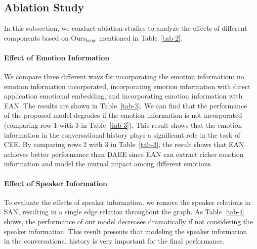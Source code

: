 \documentclass[11pt]{article}
\begin{document}
\subsection{Ablation Study}
In this subsection, we conduct ablation studies to analyze the effects of different components based on $\text{Ours}_{large}$ mentioned in Table~\ref{tab-2}.


\paragraph{Effect of Emotion Information}

We compare three different ways for incorporating the emotion information: no emotion information incorporated, incorporating emotion information with direct application emotional embedding, and incorporating emotion information with EAN. The results are shown in Table~\ref{tab-3}.
We can find that the performance of the proposed model degrades if the emotion information is not incorporated (comparing row 1 with 3 in Table~\ref{tab-3}). This result shows that the emotion information in the conversational history plays a significant role in the task of CEE. By comparing rows 2 with 3 in Table~\ref{tab-3}, the result shows that EAN achieves better performance than DAEE since EAN can extract richer emotion information and model the mutual impact among different emotions.

\begin{table}[tbp]
\centering
{}
\caption{Comparison of different ways of incorporating emotion information. \textit{No}: no emotion information incorporated; \textit{DAEE}: incorporating the emotion information with direct application emotional embedding.}
\label{tab-3}
\end{table}



\paragraph{Effect of Speaker Information}
To evaluate the effects of speaker information, we remove the speaker relations in SAN, resulting in a single edge relation throughout the graph. As Table~\ref{tab-4} shows, the performance of our model decreases dramatically if not considering the speaker information. This result presents that modeling the speaker information in the conversational history is very important for the final performance.
\end{document}
